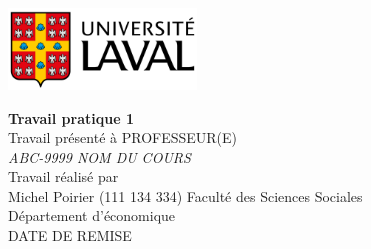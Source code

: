 
\thispagestyle{empty}	                        %
\begin{center}
    \includegraphics[width=5cm]{logo.png}	    %
\end{center}
\vspace{4cm}	                                %
\begin{center}	                                %
    {\huge \bf Travail pratique 1}\\                        %
    \vspace{3cm}
    \large Travail présenté à PROFESSEUR(E)\\\textit{ABC-9999 NOM DU COURS} \\
    \vspace{3cm}
    Travail réalisé par\\Michel Poirier (111 134 334)
    \vfill	                                    %
    Faculté des Sciences Sociales\\
    Département d'économique\\
    DATE DE REMISE
\end{center}
\newpage
